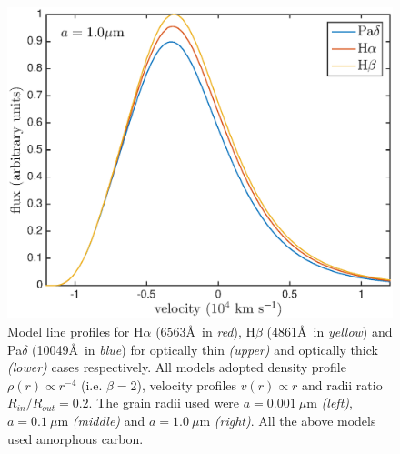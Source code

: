 \documentclass[useAMS,usenatbib,usegraphicx]{mnras}
\begin{document}
\begin{figure}
\includegraphics[trim =48 10 45 15,clip=true,scale=0.35]{a1_opt_thick_HaHbPad}
\caption{Model line profiles for H$\alpha$ (6563\AA\ in \textit{red}), H$\beta$ (4861\AA\ in \textit{yellow}) and Pa$\delta$ (10049\AA\ in \textit{blue}) for optically thin \textit{(upper)} and  optically thick \textit{(lower)} cases respectively.  All models adopted density profile $\rho(r) \propto r^{-4}$ (i.e. $\beta = 2$), velocity profiles $v(r) \propto r$ and radii ratio $R_{in}/R_{out}=0.2$.  The grain radii used were $a=0.001~\mu$m \textit{(left)}, $a=0.1~\mu$m \textit{(middle)} and $a=1.0~\mu$m \textit{(right)}. All the above models used amorphous carbon.}
\label{wav_dep}
\end{figure}
\end{document}
